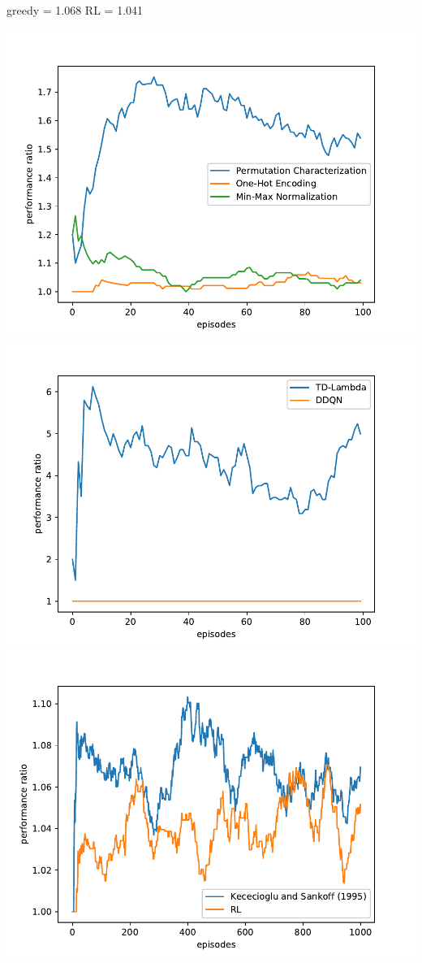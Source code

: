 \documentclass[11pt,twoside]{article}
\begin{document}
greedy = 1.068
RL = 1.041

\includegraphics{charts/states_comp.pdf}
\includegraphics{charts/lambda_ddqn.pdf}
\includegraphics{charts/rl_greedy_comp.pdf}



\end{document}
